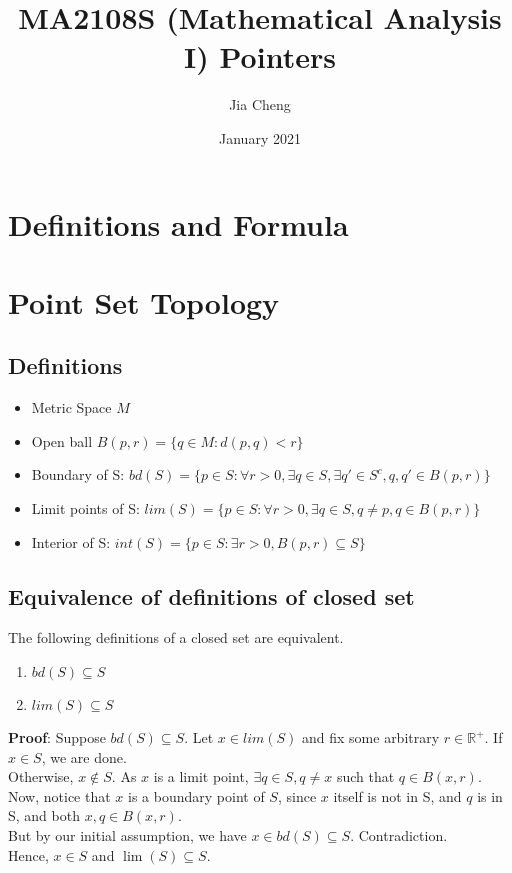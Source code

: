\documentclass{article}
\title{MA2108S (Mathematical Analysis I) Pointers}
\author{Jia Cheng}
\date{January 2021}
\begin{document}
\maketitle

\section{Definitions and Formula}

\section{Point Set Topology}
\subsection{Definitions}
\begin{itemize}
	\item Metric Space $M$
	\item Open ball $B(p,r)=\{q\in M : d(p,q) < r \}$
	\item Boundary of S: $bd(S)=\{p\in S : \forall r > 0, \exists q\in S, \exists q'\in S^c, q,q'\in B(p,r) \}$
	\item Limit points of S: $lim(S)=\{p\in S : \forall r > 0, \exists q\in S, q\neq p, q\in B(p,r) \}$
	\item Interior of S: $int(S)=\{p\in S : \exists r > 0, B(p,r)\subseteq S\}$
\end{itemize}
\subsection{Equivalence of definitions of closed set}
The following definitions of a closed set are equivalent.

\begin{enumerate}
	\item $bd(S)\subseteq S$
	\item $lim(S)\subseteq S$
\end{enumerate}

\textbf{Proof}: Suppose $bd(S)\subseteq S$. 
Let $x\in lim(S)$ and fix some arbitrary $r\in \mathbb{R}^+$.
If $x\in S$, we are done.\\
Otherwise,  $x\not \in S$. As $x$ is a limit point, $\exists q\in S, q\neq x$ such that $q\in B(x,r)$. Now, notice that $x$ is a boundary point of $S$, since $x$ itself is not in S, and $q$ is in S, and both $x,q\in B(x,r)$.\\
But by our initial assumption, we have $x\in bd(S)\subseteq S$. Contradiction.\\
Hence, $x\in S$ and $\lim(S)\subseteq S$.
\end{document}
